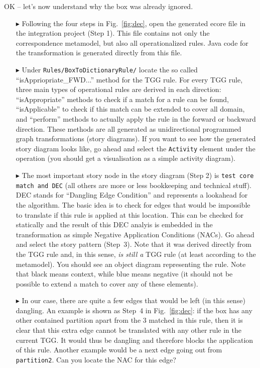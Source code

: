 OK -- let's now understand why the box was already ignored.

\begin{itemize}
\item[$\blacktriangleright$] Following the four steps in Fig.~\ref{fig:dec}, open the generated ecore file in the integration project (Step 1).
This file contains not only the correspondence metamodel, but also all operationalized rules.
Java code for the transformation is generated directly from this file.
\item[$\blacktriangleright$] Under \texttt{Rules/BoxToDictionaryRule/} locate the so called ``isAppriopriate\_FWD...'' method for the TGG rule.
For every TGG rule, three main types of operational rules are derived in each direction:  ``isAppropriate'' methods to check if a match for a rule can be found, ``isApplicable'' to check if this match can be extended to cover all domain, and ``perform'' methods to actually apply the rule in the forward or backward direction.
These methods are all generated as unidirectional programmed graph transformations (story diagrams).
If you want to see how the generated story diagram looks like, go ahead and select the \texttt{Activity} element under the operation (you should get a visualisation as a simple activity diagram).
\item[$\blacktriangleright$] The most important story node in the story diagram (Step 2) is \texttt{test core match and DEC} (all others are more or less bookkeeping and technical stuff).
DEC stands for ``Dangling Edge Condition'' and represents a lookahead for the algorithm.
The basic idea is to check for edges that would be impossible to translate if this rule is applied at this location.
This can be checked for statically and the result of this DEC analyis is embedded in the transformation as simple Negative Application Conditions (NACs). 
Go ahead and select the story pattern (Step~3).
Note that it was derived directly from the TGG rule and, in this sense, \emph{is still a} TGG rule (at least according to the metamodel).
You should see an object diagram representing the rule.
Note that black means context, while blue means negative (it should not be possible to extend a match to cover any of these elements).

\item[$\blacktriangleright$] In our case, there are quite a few edges that would be left (in this sense) dangling.
An example is shown as Step~4 in Fig.~\ref{fig:dec}:  if the box has any other contained partition apart from the 3 matched in this rule, then it is clear that this extra edge cannot be translated with any other rule in the current TGG.
It would thus be dangling and therefore blocks the application of this rule.
Another example would be a next edge going out from \texttt{partition2}.
Can you locate the NAC for this edge?
\end{itemize}

